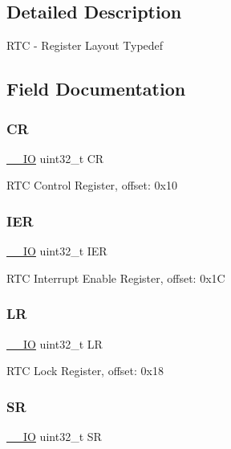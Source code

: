 \subsection{Detailed Description}
R\+TC -\/ Register Layout Typedef 

\subsection{Field Documentation}
\mbox{\label{struct_r_t_c___type_ab40c89c59391aaa9d9a8ec011dd0907a}} 
\subsubsection{\texorpdfstring{CR}{CR}}
{\footnotesize\ttfamily \mbox{\hyperlink{core__cm0plus_8h_aec43007d9998a0a0e01faede4133d6be}{\+\_\+\+\_\+\+IO}} uint32\+\_\+t CR}

R\+TC Control Register, offset\+: 0x10 \mbox{\label{struct_r_t_c___type_a6566f8cfbd1d8aa7e8db046aa35e77db}} 
\subsubsection{\texorpdfstring{IER}{IER}}
{\footnotesize\ttfamily \mbox{\hyperlink{core__cm0plus_8h_aec43007d9998a0a0e01faede4133d6be}{\+\_\+\+\_\+\+IO}} uint32\+\_\+t I\+ER}

R\+TC Interrupt Enable Register, offset\+: 0x1C \mbox{\label{struct_r_t_c___type_a7006c26539198fbc8729e0386bffdd40}} 
\subsubsection{\texorpdfstring{LR}{LR}}
{\footnotesize\ttfamily \mbox{\hyperlink{core__cm0plus_8h_aec43007d9998a0a0e01faede4133d6be}{\+\_\+\+\_\+\+IO}} uint32\+\_\+t LR}

R\+TC Lock Register, offset\+: 0x18 \mbox{\label{struct_r_t_c___type_af6aca2bbd40c0fb6df7c3aebe224a360}} 
\subsubsection{\texorpdfstring{SR}{SR}}
{\footnotesize\ttfamily \mbox{\hyperlink{core__cm0plus_8h_aec43007d9998a0a0e01faede4133d6be}{\+\_\+\+\_\+\+IO}} uint32\+\_\+t SR}

